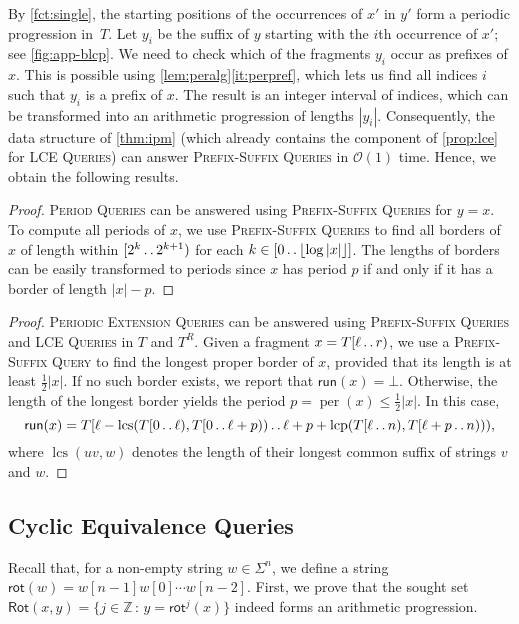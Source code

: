 \documentclass[a4paper]{article}
\theoremstyle{definition}
\theoremstyle{remark}
\newcommand{\PQ}{\textsc{Period Queries}\xspace}
\newcommand{\BQ}{\textsc{Prefix-Suffix Queries}\xspace}
\newcommand{\BQone}{\textsc{Prefix-Suffix Query}\xspace}
\newcommand{\PEQ}{\textsc{Periodic Extension Queries}\xspace}
\newcommand{\LCEQ}{\textsc{LCE Queries}\xspace}
\newcommand{\floor}[1]{\left\lfloor #1 \right\rfloor}
\newcommand{\integ}{\mathbb{Z}}
\newcommand{\lcs}{\operatorname{lcs}}
\newcommand{\lcp}{\operatorname{lcp}}
\newcommand{\dd}{\mathinner{\ldotp\ldotp}}
\DeclareMathOperator{\per}{per}
\newcommand{\Rot}{\mathsf{rot}}
\newcommand{\ROT}{\mathsf{Rot}}
\newcommand{\maybeqed}{}
\newcommand{\Oh}{\mathcal{O}}
\newcommand{\run}{\mathsf{run}}
\begin{document}
By \cref{fct:single}, the starting positions of the occurrences of $x'$ in $y'$ form a periodic progression in~$T$.
Let $y_i$ be the suffix of $y$ starting with the $i$th occurrence of $x'$; see \cref{fig:app-blcp}.
We need to check which of the fragments $y_i$ occur as prefixes of $x$.
This is possible using \cref{lem:peralg}\ref{it:perpref}, which lets us find all indices $i$ such that $y_i$ is a prefix of $x$.
The result is an integer interval of indices, which can be transformed into an arithmetic progression of lengths $|y_i|$.
Consequently, the data structure of \cref{thm:ipm} (which already contains the component of \cref{prop:lce} for \LCEQ) can answer \BQ in $\Oh(1)$ time.
Hence, we obtain the following results.

\thmappbq*


\thmapppq*

\begin{proof}
\PQ can be answered using \BQ for $y=x$.
To compute all periods of $x$, we use \BQ to find all borders of $x$ of length within $[2^k\dd 2^{k+1})$ for each $k\in [0\dd \floor{\log |x|}]$.
The lengths of borders can be easily transformed to periods since $x$ has period $p$ if and only if it has a border of length $|x|-p$.
\maybeqed \end{proof}


\thmrun*
\begin{proof}
  \PEQ can be answered using \BQ and \LCEQ in $T$ and $T^R$.
  Given a fragment $x=T[\ell\dd r)$, we use a \BQone to find the longest proper border of $x$, provided that its length is at least $\tfrac12|x|$.
  If no such border exists, we report that $\run(x)=\bot$.
  Otherwise, the length of the longest border yields the period $p=\per(x)\le \tfrac12|x|$.
  In this case, \[\run(x)=T[\ell - \lcs(T[0\dd \ell),T[0\dd \ell+p))\dd \ell + p + \lcp(T[\ell\dd n),T[\ell+p\dd n))),\]
  where $\lcs(uv,w)$ denotes the length of their longest common suffix of strings $v$ and $w$.
\maybeqed \end{proof}


\subsection{Cyclic Equivalence Queries}\label{sec:FC}

Recall that, for a non-empty string $w\in \Sigma^n$, we define a string $\Rot(w) = w[n-1]w[0]\cdots w[n-2]$.
First, we prove that the sought set $\ROT(x,y)=\{j\in \integ\,:\, y= \Rot^j(x)\}$
indeed forms an arithmetic progression.
\end{document}
